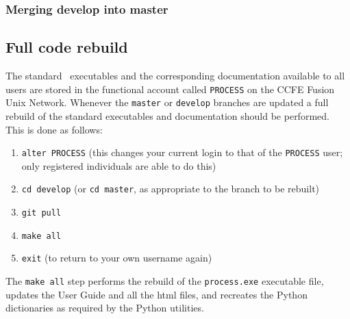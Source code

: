 \subsubsection{Merging develop into master}


\subsection{Full code rebuild}
\label{sec:fullrebuild}

The standard \process\ executables and the corresponding documentation
available to all users are stored in the functional account called
\texttt{PROCESS} on the CCFE Fusion Unix Network. Whenever the \texttt{master}
or \texttt{develop} branches are updated a full rebuild of the standard
executables and documentation should be performed. This is done as follows:
\begin{enumerate}

\item \texttt{alter PROCESS}  (this changes your current login to that of the
  \texttt{PROCESS} user; only registered individuals are able to do this)

\item \texttt{cd develop}  (or \texttt{cd master}, as appropriate to the
  branch to be rebuilt)

\item \texttt{git pull}

\item \texttt{make all}

\item \texttt{exit}  (to return to your own username again)

\end{enumerate}

The \texttt{make all} step performs the rebuild of the \texttt{process.exe} executable
file, updates the User Guide and all the html files, and recreates the Python
dictionaries as required by the Python utilities.
